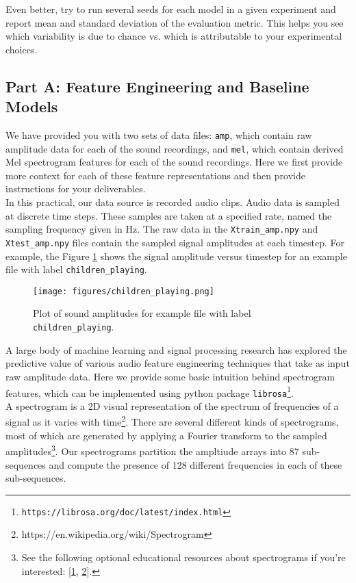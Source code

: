 \documentclass[12pt]{article}
\begin{document}
\noindent Even better, try to run several seeds for each model in a given experiment and report mean and standard deviation of the evaluation metric. This helps you see which variability is due to chance vs. which is attributable 
to your experimental choices.

\subsection{Part A: Feature Engineering and Baseline Models}

We have provided you with two sets of data files: \texttt{amp}, which contain raw amplitude data for each of the sound recordings, and \texttt{mel}, which contain derived Mel spectrogram features for each of the sound recordings.  Here we first provide more context for each of these feature representations and then provide instructions for your deliverables.\\

\noindent In this practical, our data source is recorded audio clips.  Audio data is sampled at discrete time steps.  These samples are taken at a specified rate, named the sampling frequency given in Hz.  The raw data in the \texttt{Xtrain\_amp.npy} and \texttt{Xtest\_amp.npy} files contain the sampled signal amplitudes at each timestep.  For example, the Figure \ref{fig:amplitude_plot} shows the signal amplitude versus timestep for an example file with label \texttt{children\_playing}.
\begin{figure}
\centering
\texttt{[image: figures/children\_playing.png]}
\caption{Plot of sound amplitudes for example file with label \texttt{children\_playing}.}
\label{fig:amplitude_plot}
\end{figure}
A large body of machine learning and signal processing research has explored the predictive value of various audio feature engineering techniques that take as input raw amplitude data.  Here we provide some basic intuition behind spectrogram features, which can be implemented using python package \texttt{librosa\footnote{https://librosa.org/doc/latest/index.html}}.\\ 

\noindent A spectrogram is a 2D visual representation of the spectrum of frequencies of a signal as it varies with time\footnote{https://en.wikipedia.org/wiki/Spectrogram}.  There are several different kinds of spectrograms, most of which are generated by applying a Fourier transform to the sampled amplitudes\footnote{See the following optional educational resources about spectrograms if you're interested: [\href{https://www.izotope.com/en/learn/understanding-spectrograms.html}{1}, \href{https://www.princeton.edu/~cuff/ele201/files/spectrogram.pdf}{2}].}.
Our spectrograms partition the ampltiude arrays into 87 
sub-sequences and compute the presence of 128 different frequencies in each of these sub-sequences.\\
\end{document}
